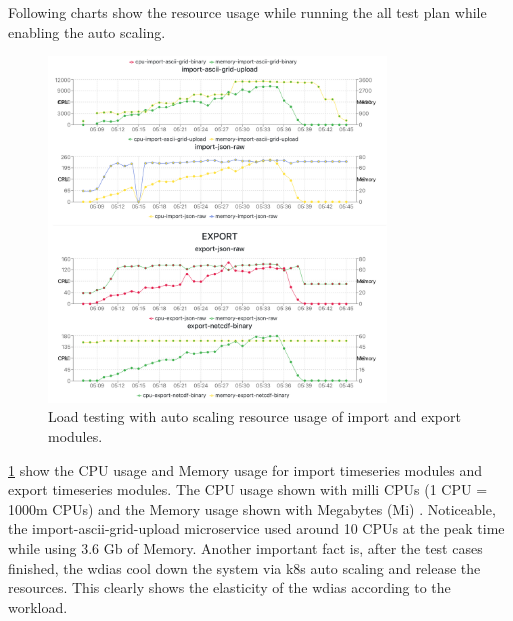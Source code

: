 Following charts show the resource usage while running the all test plan while enabling the auto scaling.
\begin{figure}[htp]
    \centering
    \includegraphics[width=0.8\textwidth]{results/obs/all_auto/obs_all_auto_15m_import_export_res.png}
    \caption{Load testing with auto scaling resource usage of import and export modules.}
    \label{fi:obs_all_auto_15m_import_export_res}
\end{figure}
\ref{fi:obs_all_auto_15m_import_export_res} show the CPU usage and Memory usage for import timeseries modules and export timeseries modules. The CPU usage shown with milli CPUs \cite{LinuxFoundationManagingKubernetes} (1 CPU = 1000m CPUs) and the Memory usage shown with Megabytes (Mi) \cite{LinuxFoundationManagingKubernetes}. Noticeable, the import-ascii-grid-upload microservice used around 10 CPUs at the peak time while using 3.6 Gb of Memory. Another important fact is, after the test cases finished, the \acrshort{wdias} cool down the system via \acrshort{k8s} auto scaling and release the resources. This clearly shows the elasticity of the \acrshort{wdias} according to the workload.

